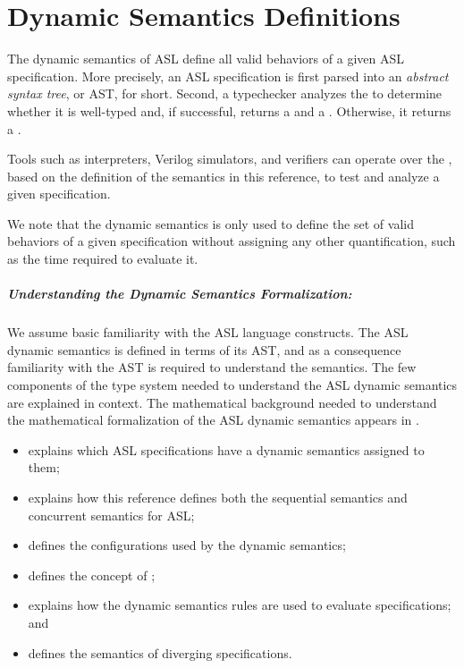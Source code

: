 \chapter{Dynamic Semantics Definitions\label{chap:Semantics}}

The dynamic semantics of ASL define all valid behaviors of a given ASL specification.
More precisely, an ASL specification is first parsed into an \emph{abstract syntax tree},
or AST, for short. Second, a typechecker analyzes the \emph{\untypedast} to determine whether it
is well-typed and, if successful, returns a \emph{\staticenvironmentterm{}} and a \emph{\typedast}.
Otherwise, it returns a \typingerrorterm{}.

Tools such as interpreters, Verilog simulators, and verifiers can operate over the \typedast,
based on the definition of the semantics in this reference, to test and analyze a given specification.

We note that the dynamic semantics is only used to define the set of valid behaviors
of a given specification without assigning any other quantification, such as the time
required to evaluate it.

\paragraph{Understanding the Dynamic Semantics Formalization:}
We assume basic familiarity with the ASL language constructs.
The ASL dynamic semantics is defined in terms of its AST,
and as a consequence familiarity with the AST is required to understand the semantics.
The few components of the type system needed to understand the ASL dynamic semantics are explained in context.
The mathematical background needed to understand the mathematical formalization
of the ASL dynamic semantics appears in .

\ChapterOutline
\begin{itemize}
  \item {} explains which ASL specifications have a dynamic semantics
        assigned to them;
  \item {} explains how this reference defines both the
        sequential semantics and concurrent semantics for ASL;
  \item {} defines the configurations used by the dynamic semantics;
  \item {} defines the concept of \nativevaluesterm{};
  \item {} explains how the dynamic semantics rules are used to evaluate specifications; and
  \item {} defines the semantics of diverging specifications.
\end{itemize}

